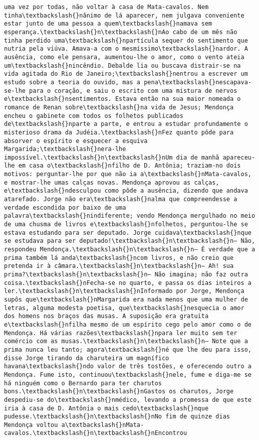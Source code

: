 \documentclass[11pt]{article}
\begin{document}
\begin{Verbatim}[commandchars=\\\{\}]
uma vez por todas, não voltar à casa de Mata-cavalos. Nem tinha\textbackslash{}nânimo de lá aparecer, nem julgava conveniente estar junto de uma pessoa a quem\textbackslash{}namava sem esperança.\textbackslash{}n\textbackslash{}nAo cabo de um mês não tinha perdido uma\textbackslash{}npartícula sequer do sentimento que nutria pela viúva. Amava-a com o mesmíssimo\textbackslash{}nardor. A ausência, como ele pensara, aumentou-lhe o amor, como o vento ateia um\textbackslash{}nincêndio. Debalde lia ou buscava distrair-se na vida agitada do Rio de Janeiro;\textbackslash{}nentrou a escrever um estudo sobre a teoria do ouvido, mas a pena\textbackslash{}nescapava-se-lhe para o coração, e saiu o escrito com uma mistura de nervos e\textbackslash{}nsentimentos. Estava então na sua maior nomeada o romance de Renan sobre\textbackslash{}na vida de Jesus; Mendonça encheu o gabinete com todos os folhetos publicados de\textbackslash{}nparte a parte, e entrou a estudar profundamente o misterioso drama da Judéia.\textbackslash{}nFez quanto pôde para absorver o espírito e esquecer a esquiva Margarida;\textbackslash{}nera-lhe impossível.\textbackslash{}n\textbackslash{}nUm dia de manhã apareceu-lhe em casa o\textbackslash{}nfilho de D. Antônia; traziam-no dois motivos: perguntar-lhe por que não ia a\textbackslash{}nMata-cavalos, e mostrar-lhe umas calças novas. Mendonça aprovou as calças, e\textbackslash{}ndesculpou como pôde a ausência, dizendo que andava atarefado. Jorge não era\textbackslash{}nalma que compreendesse a verdade escondida por baixo de uma palavra\textbackslash{}nindiferente; vendo Mendonça mergulhado no meio de uma chusma de livros e\textbackslash{}nfolhetos, perguntou-lhe se estava estudando para ser deputado. Jorge cuidava\textbackslash{}nque se estudava para ser deputado!\textbackslash{}n\textbackslash{}n— Não, respondeu Mendonça.\textbackslash{}n\textbackslash{}n— É verdade que a prima também lá anda\textbackslash{}ncom livros, e não creio que pretenda ir à câmara.\textbackslash{}n\textbackslash{}n— Ah! sua prima?\textbackslash{}n\textbackslash{}n— Não imagina; não faz outra coisa.\textbackslash{}nFecha-se no quarto, e passa os dias inteiros a ler.\textbackslash{}n\textbackslash{}nInformado por Jorge, Mendonça supôs que\textbackslash{}nMargarida era nada menos que uma mulher de letras, alguma modesta poetisa, que\textbackslash{}nesquecia o amor dos homens nos braços das musas. A suposição era gratuita e\textbackslash{}nfilha mesmo de um espírito cego pelo amor como o de Mendonça. Há várias razões\textbackslash{}npara ler muito sem ter comércio com as musas.\textbackslash{}n\textbackslash{}n— Note que a prima nunca leu tanto; agora\textbackslash{}né que lhe deu para isso, disse Jorge tirando da charuteira um magnífico havana\textbackslash{}ndo valor de três tostões, e oferecendo outro a Mendonça. Fume isto, continuou\textbackslash{}nele, fume e diga-me se há ninguém como o Bernardo para ter charutos bons.\textbackslash{}n\textbackslash{}nGastos os charutos, Jorge despediu-se do\textbackslash{}nmédico, levando a promessa de que este iria à casa de D. Antônia o mais cedo\textbackslash{}nque pudesse.\textbackslash{}n\textbackslash{}nNo fim de quinze dias Mendonça voltou a\textbackslash{}nMata-cavalos.\textbackslash{}n\textbackslash{}nEncontrou 
\end{Verbatim}
\end{document}
